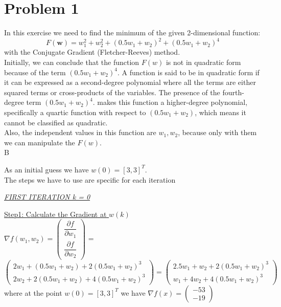 \section{Problem 1}
In this exercise we need to find the minimum of the given 2-dimensional function:\\
\begin{equation}	
		F(\mathbf{w})=w_{1}^{2}+w_{2}^{2}+(0.5w_{1}+w_{2})^{2}+(0.5w_{1}+w_{2})^{4}	
\end{equation}
with the Conjugate Gradient (Fletcher-Reeves) method.\\

Initially, we can conclude that the function $F(w)$ is not in quadratic form because of the term $(0.5w_{1}+w_{2})^{4}$.
A function is said to be in quadratic form if it can be expressed as a second-degree polynomial where all the terms are either squared terms or cross-products of the variables. The presence of the fourth-degree term $(0.5w_{1}+w_{2})^{4}$.
makes this function a higher-degree polynomial, specifically a quartic function with respect to $(0.5w_{1}+w_{2})$, which means it cannot be classified as quadratic.\\
Also, the independent values in this function are $w_{1},w_{2}$, because only with them we can manipulate the $F(w)$.\\ B

As an initial guess we have $w\left(0\right) = \left[3, 3\right]^T$.\\
Τhe steps we have to use are specific for each iteration

\begin{center}
	\underline{\textit{FIRST ITERATION k = 0}}
\end{center}

\underline{Step1: Calculate the Gradient at  $w\left(k\right)$ }\\
\(\nabla f(w_1,w_2) = \left(\begin{array}{c}
	\dfrac{\partial f}{\partial w_1} \\[4mm]
	\dfrac{\partial f}{\partial w_2}
\end{array}\right)\) = $\left(\begin{array}{c}
	2w_1 + (0.5w_1+w_2) + 2(0.5w_1+w_2)^3\\[1mm]
	2w_2 + 2(0.5w_1+w_2) + 4(0.5w_1+w_2)^3
\end{array}\right) = \left(\begin{array}{c}
	2.5w_1 + w_2 + 2(0.5w_1+w_2)^3\\[1mm]
	w_1 + 4w_2 + 4(0.5w_1+w_2)^3
\end{array}\right)$ \\[3mm]

where at the point $w\left(0\right) = \left[3, 3\right]^T$ we have $\nabla f(x) = \left(\begin{array}{c}
	-53 \\
	-19
\end{array}\right)$
\\[4mm]


